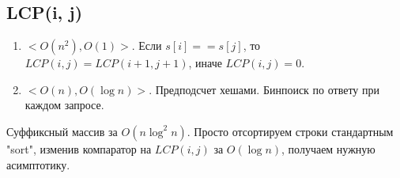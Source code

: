 \subsection{LCP(i, j)}

\begin{enumerate}
\item 
  $<O(n^2), O (1)>$. 
  Если $s[i] == s[j]$, то $LCP(i, j) = LCP(i+1, j+1)$, иначе $LCP(i,j) = 0$.
\item
  $<O(n), O(\log n)>$. 
  Предподсчет хешами. 
  Бинпоиск по ответу при каждом запросе.
\end{enumerate}

Суффиксный массив за $O(n \log^2 n)$.
Просто отсортируем строки стандартным \cpp"sort", изменив компаратор на $LCP(i, j)$ за $O(\log n)$, получаем нужную асимптотику.